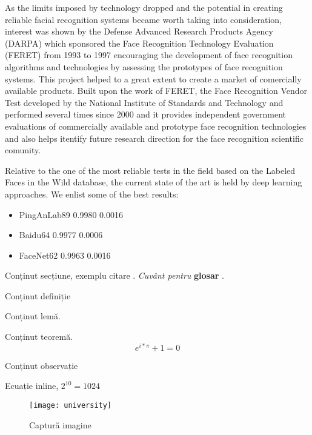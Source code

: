 As the limits imposed by technology dropped and the potential in creating reliable facial recognition systems became worth taking into consideration, interest was shown by the Defense Advanced Research Products Agency (DARPA) which sponsored the Face Recognition Technology Evaluation (FERET) \cite{PhillipsJMHRSRP00} from 1993 to 1997 encouraging the development of face recognition algorithms and technologies by assessing the prototypes of face recognition systems. This project helped to a great extent to create a market of comercially available products.
Built upon the work of FERET, the Face Recognition Vendor Test \cite{PhillipsGMBTB03} developed by the National Institute of Standards and Technology \cite{FaceNist} and performed several times since 2000 and it provides independent government evaluations of commercially available and prototype face recognition technologies and also helps itentify future research direction for the face recognition scientific comunity.



Relative to the one of the most reliable tests in the field based on the Labeled Faces in the Wild database, the current state of the art is held by deep learning approaches. We enlist some of the best results:
\begin{itemize}
	\item PingAnLab89 0.9980 0.0016
	\item Baidu64 0.9977 0.0006
	\item FaceNet62 0.9963 0.0016
\end{itemize}



Conținut secțiune, exemplu citare \cite{hoare_csp}.
\textit{Cuvânt pentru} \textbf{glosar} .	

\begin{definition}
	Conținut definiție
\end{definition}

\begin{lemma}
	Conținut lemă.
\end{lemma}

\begin{theorem}
	Conținut teoremă.
	\[
		e^{i * \pi} + 1 = 0
	\]
\end{theorem}

\begin{remark}
	Conținut observație
\end{remark}

Ecuație inline, $2^{10} = 1024 $

\begin{figure}[h]
	\begin{center}
			\texttt{[image: university]}
	\end{center}
	\caption{Captură imagine}
\end{figure}